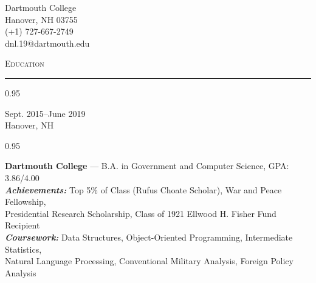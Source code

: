 \documentclass[a4paper,9pt]{article}
\newcommand{\mainMarginBottom}{\vspace*{1.5pt}}
\newcommand{\newLine}{\\}
\newcommand{\doubleColumnGap}{\hspace{4mm}}
\newcommand{\sectionMarginTopBottom}{\vspace*{9pt}}
\newcommand{\sectionMarginBetweenAdd}{\vspace{20pt}}
\newcommand{\mainLineSpacing}{0.95}
\newcommand{\titleMarginBelow}{\vspace*{2ex}}
\def\hrulefill{\leavevmode\leaders\hrule height 1.75pt\hfill\kern0pt}
\begin{document}
\begin{minipage}[b]{0.70\linewidth}
\end{minipage}
\begin{minipage}[b]{0.29\linewidth}
  \begin{flushright}
    \begin{small}
      Dartmouth College
      \newLine{}
      \mainMarginBottom{}
      Hanover, NH 03755
      \newLine{}
      \mainMarginBottom{}
      (+1) 727-667-2749
      \newLine{}
      \mainMarginBottom{}
      dnl.19@dartmouth.edu
    \end{small}
  \end{flushright}
\end{minipage}

\titleMarginBelow{}
\sectionMarginBetweenAdd{}

\hspace*{12pt}\textsc{\fontsize{20}{24}\selectfont Education}\hspace*{14pt}\hrulefill
\sectionMarginTopBottom{}

\begin{minipage}[t]{0.20\linewidth}
  \begin{small}
    \begin{spacing}\mainLineSpacing{}
      \begin{flushright}
        Sept. 2015--June 2019
        \newLine{}
        \mainMarginBottom{}
        Hanover, NH
      \end{flushright}
    \end{spacing}
  \end{small}
\end{minipage}
\doubleColumnGap{}
\begin{minipage}[t]{0.75\linewidth}
  \begin{small}
    \begin{spacing}\mainLineSpacing{}
      \begin{flushleft}
        \textbf{Dartmouth College} --- B.A. in Government and Computer Science, GPA: 3.86/4.00
        \newLine{}
        \mainMarginBottom{}
        \textit{\textbf{Achievements:}} Top 5\% of Class (Rufus Choate Scholar), War and Peace Fellowship,\\ Presidential Research Scholarship, Class of 1921 Ellwood H. Fisher Fund Recipient
        \newLine{}
        \mainMarginBottom{}
        \textit{\textbf{Coursework:}} Data Structures, Object-Oriented Programming, Intermediate Statistics,
        \\ Natural Language Processing, Conventional Military Analysis, Foreign Policy Analysis
      \end{flushleft}
    \end{spacing}
  \end{small}
\end{minipage}
\end{document}
